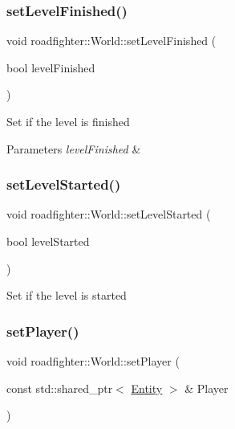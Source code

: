\subsubsection{\texorpdfstring{set\+Level\+Finished()}{setLevelFinished()}}
{\footnotesize\ttfamily void roadfighter\+::\+World\+::set\+Level\+Finished (\begin{DoxyParamCaption}\item[{bool}]{level\+Finished }\end{DoxyParamCaption})}

Set if the level is finished 
\begin{DoxyParams}{Parameters}
{\em level\+Finished} & \\
\hline
\end{DoxyParams}
\mbox{\label{classroadfighter_1_1World_af45ecafe1e5ee7cd2262922f2b4926d7}} 
\subsubsection{\texorpdfstring{set\+Level\+Started()}{setLevelStarted()}}
{\footnotesize\ttfamily void roadfighter\+::\+World\+::set\+Level\+Started (\begin{DoxyParamCaption}\item[{bool}]{level\+Started }\end{DoxyParamCaption})}

Set if the level is started \mbox{\label{classroadfighter_1_1World_ae29618ab34613cd4f0e9caafcae742ac}} 
\subsubsection{\texorpdfstring{set\+Player()}{setPlayer()}}
{\footnotesize\ttfamily void roadfighter\+::\+World\+::set\+Player (\begin{DoxyParamCaption}\item[{const std\+::shared\+\_\+ptr$<$ \hyperlink{classroadfighter_1_1Entity}{Entity} $>$ \&}]{Player }\end{DoxyParamCaption})}


